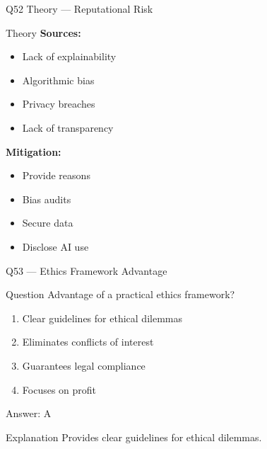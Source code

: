 \documentclass[aspectratio=169,8pt]{beamer}
\begin{document}
	\begin{frame}{Q52 Theory --- Reputational Risk}
		\begin{block}{Theory}
			\textbf{Sources:}
			\begin{itemize}
				\item Lack of explainability
				\item Algorithmic bias
				\item Privacy breaches
				\item Lack of transparency
			\end{itemize}
			\textbf{Mitigation:}
			\begin{itemize}
				\item Provide reasons
				\item Bias audits
				\item Secure data
				\item Disclose AI use
			\end{itemize}
		\end{block}
	\end{frame}
	
	\begin{frame}{Q53 --- Ethics Framework Advantage}
		\begin{block}{Question}
			Advantage of a practical ethics framework?
		\end{block}
		\begin{enumerate}[label=\Alph*.]
			\item Clear guidelines for ethical dilemmas
			\item Eliminates conflicts of interest
			\item Guarantees legal compliance
			\item Focuses on profit
		\end{enumerate}
		\begin{exampleblock}{Answer: A}
		\end{exampleblock}
		\begin{block}{Explanation}
			Provides clear guidelines for ethical dilemmas.
		\end{block}
	\end{frame}
	
\end{document}
